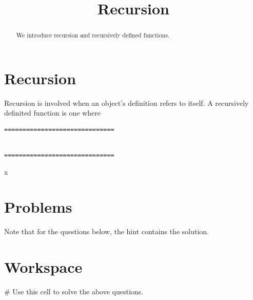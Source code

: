 \documentclass{ximera}
\title{Recursion}
\begin{document}
  
\begin{abstract}  
We introduce recursion and recursively defined functions.
\end{abstract}  
\maketitle

\section{Recursion}

Recursion is involved when an object's definition refers to itself. A recursively definited function is one where 

\begin{verbatim}
==============================


==============================
\end{verbatim}


\begin{sageCell}
x
\end{sageCell}

\section{Problems}

Note that for the questions below, the hint contains the solution.

\section{Workspace}

\begin{sageCell}
# Use this cell to solve the above questions.
\end{sageCell}
\end{document}

